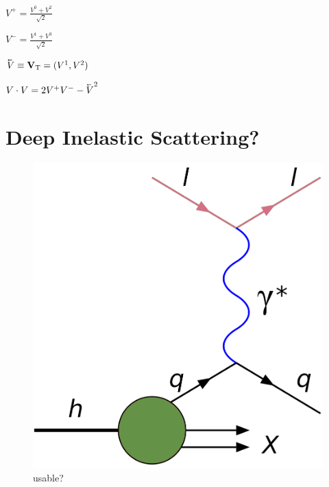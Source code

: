 $V^+ = \frac{V^0 + V^2}{\sqrt{2}}$

$V^- = \frac{V^1 + V^3}{\sqrt{2}}$

$\cev{V} \equiv {\mathbf{V}}\dol{T} = (V^1, V^2)$

$V \cdot V = 2 V^+ V^- - \cev{V}^2$

\section{Deep Inelastic Scattering?}

\begin{figure}[H]
    \centering
    \includegraphics[width=.3\linewidth]{img/dis.png}
    \caption{usable?}
    \label{fig:physics:dis}
\end{figure}

